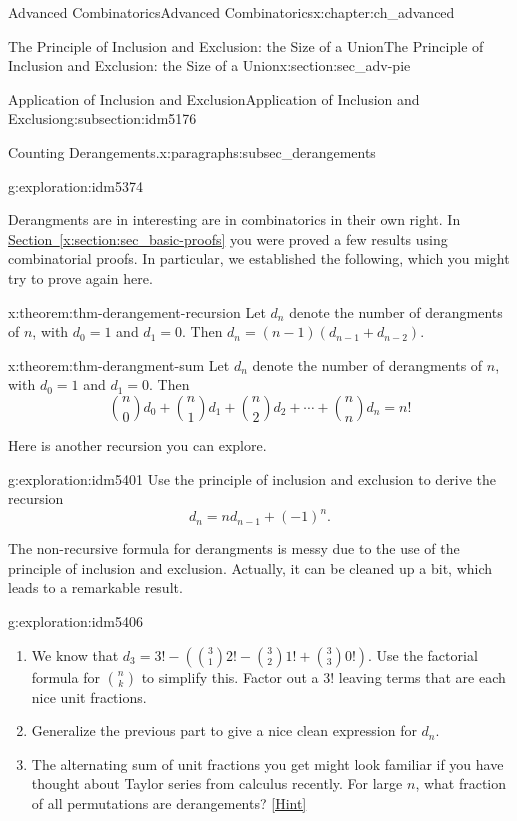 \documentclass[oneside,10pt,]{book}
\numberwithin{equation}{chapter}
\begin{document}
\begin{chapterptx}{Advanced Combinatorics}{}{Advanced Combinatorics}{}{}{x:chapter:ch_advanced}
\begin{sectionptx}{The Principle of Inclusion and Exclusion: the Size of a Union}{}{The Principle of Inclusion and Exclusion: the Size of a Union}{}{}{x:section:sec_adv-pie}
\begin{subsectionptx}{Application of Inclusion and Exclusion}{}{Application of Inclusion and Exclusion}{}{}{g:subsection:idm5176}
\begin{paragraphs}{Counting Derangements.}{x:paragraphs:subsec_derangements}
\begin{exploration}{}{g:exploration:idm5374}
\end{exploration}
Derangments are in interesting are in combinatorics in their own right.  In \hyperref[x:section:sec_basic-proofs]{Section~\ref{x:section:sec_basic-proofs}} you were  proved a few results using combinatorial proofs.  In particular, we established the following, which you might try to prove again here.%
\begin{theorem}{}{}{x:theorem:thm-derangement-recursion}%
Let \(d_n\) denote the number of derangments of \(n\), with \(d_0 = 1\) and \(d_1 = 0\).  Then \(d_n = (n-1)(d_{n-1}+d_{n-2})\).%
\end{theorem}
\begin{theorem}{}{}{x:theorem:thm-derangment-sum}%
Let \(d_n\) denote the number of derangments of \(n\), with \(d_0 = 1\) and \(d_1 = 0\).  Then%
\begin{equation*}
\binom{n}{0}d_0 + \binom{n}{1}d_1 + \binom{n}{2}d_2 + \cdots + \binom{n}{n}d_n = n!
\end{equation*}
%
\end{theorem}
Here is another recursion you can explore.%
\begin{exploration}{}{g:exploration:idm5401}%
Use the principle of inclusion and exclusion to derive the recursion%
\begin{equation*}
d_n = nd_{n-1} + (-1)^n\text{.}
\end{equation*}
%
\end{exploration}
The non-recursive formula for derangments is messy due to the use of the principle of inclusion and exclusion.  Actually, it can be cleaned up a bit, which leads to a remarkable result.%
\begin{exploration}{}{g:exploration:idm5406}%
\begin{enumerate}[font=\bfseries,label=(\alph*),ref=\alph*]
\item{}We know that \(d_3 = 3! - \left(\binom{3}{1}2! - \binom{3}{2}1! + \binom{3}{3}0! \right)\).  Use the factorial formula for \(\binom{n}{k}\) to simplify this.  Factor out a \(3!\) leaving terms that are each nice unit fractions.%
\item{}Generalize the previous part to give a nice clean expression for \(d_n\).%
\item{}The alternating sum of unit fractions you get might look familiar if you have thought about Taylor series from calculus recently.  For large \(n\), what fraction of all permutations are derangements?%
\space\hspace*{0pt}\hfill{\tiny\hyperlink{g:hint:idm5421-back}{[Hint]}}\end{enumerate}

\end{exploration}
\end{paragraphs}
\end{subsectionptx}
\end{sectionptx}
\end{chapterptx}
\end{document}
